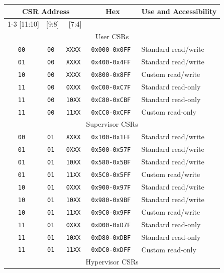 \vspace{0.2in}
\begin{table}[h!]
\begin{center}
\begin{tabular}{|c|c|c|c|l|}
\hline
\multicolumn{3}{|c|}{CSR Address} & Hex & \multicolumn{1}{c|}{Use and Accessibility}\\ \cline{1-3}
[11:10] & [9:8] & [7:4]                  &  & \\
\hline
\multicolumn{5}{|c|}{User CSRs}  \\
\hline
\tt   00   &\tt   00  &\tt   XXXX   & \tt 0x000-0x0FF & Standard read/write \\
\tt   01   &\tt   00  &\tt   XXXX   & \tt 0x400-0x4FF & Standard read/write \\
\tt   10   &\tt   00  &\tt   XXXX   & \tt 0x800-0x8FF & Custom read/write \\
\tt   11   &\tt   00  &\tt   0XXX   & \tt 0xC00-0xC7F & Standard read-only \\
\tt   11   &\tt   00  &\tt   10XX   & \tt 0xC80-0xCBF & Standard read-only \\
\tt   11   &\tt   00  &\tt   11XX   & \tt 0xCC0-0xCFF & Custom read-only \\
\hline
\multicolumn{5}{|c|}{Supervisor CSRs}  \\
\hline
\tt   00   &\tt   01  &\tt   XXXX   & \tt 0x100-0x1FF & Standard read/write \\
\tt   01   &\tt   01  &\tt   0XXX   & \tt 0x500-0x57F & Standard read/write \\
\tt   01   &\tt   01  &\tt   10XX   & \tt 0x580-0x5BF & Standard read/write \\
\tt   01   &\tt   01  &\tt   11XX   & \tt 0x5C0-0x5FF & Custom read/write \\
\tt   10   &\tt   01  &\tt   0XXX   & \tt 0x900-0x97F & Standard read/write \\
\tt   10   &\tt   01  &\tt   10XX   & \tt 0x980-0x9BF & Standard read/write \\
\tt   10   &\tt   01  &\tt   11XX   & \tt 0x9C0-0x9FF & Custom read/write \\
\tt   11   &\tt   01  &\tt   0XXX   & \tt 0xD00-0xD7F & Standard read-only \\
\tt   11   &\tt   01  &\tt   10XX   & \tt 0xD80-0xDBF & Standard read-only \\
\tt   11   &\tt   01  &\tt   11XX   & \tt 0xDC0-0xDFF & Custom read-only \\
\hline
\multicolumn{5}{|c|}{Hypervisor CSRs} \\

\end{tabular}
\end{center}
\end{table}
